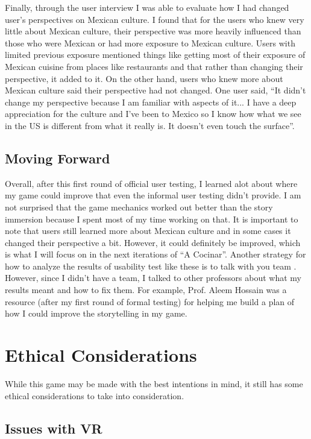 \documentclass[10pt,twocolumn]{article}
\begin{document}
Finally, through the user interview I was able to evaluate how I had changed user’s perspectives on Mexican culture. I found that for the users who knew very little about Mexican culture, their perspective was more heavily influenced than those who were Mexican or had more exposure to Mexican culture. Users with limited previous exposure mentioned things like getting most of their exposure of Mexican cuisine from places like restaurants and that rather than changing their perspective, it added to it. On the other hand, users who knew more about Mexican culture said their perspective had not changed. One user said, “It didn’t change my perspective because I am familiar with aspects of it... I have a deep appreciation for the culture and I’ve been to Mexico so I know how what we see in the US is different from what it really is. It doesn’t even touch the surface”.  
\subsection{Moving Forward}
Overall, after this first round of official user testing, I learned alot about where my game could improve that even the informal user testing didn’t provide. I am not surprised that the game mechanics worked out better than the story immersion because I spent most of my time working on that. It is important to note that users still learned more about Mexican culture and in some cases it changed their perspective a bit. However, it could definitely be improved, which is what I will focus on in the next iterations of “A Cocinar”. Another strategy for how to analyze the results of usability test like these is to talk with you team \cite{testResults}. However, since I didn't have a team, I talked to other professors about what my results meant and how to fix them. For example, Prof. Aleem Hossain was a resource (after my first round of formal testing) for helping me build a plan of how I could improve the storytelling in my game. 



\section{Ethical Considerations}
While this game may be made with the best intentions in mind, it still has some ethical considerations to take into consideration. 
\subsection{Issues with VR}
\end{document}
